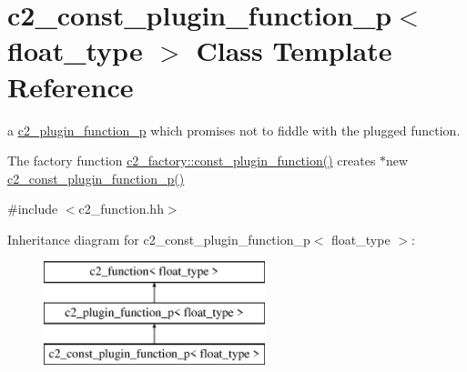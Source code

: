 \hypertarget{classc2__const__plugin__function__p}{\section{c2\-\_\-const\-\_\-plugin\-\_\-function\-\_\-p$<$ float\-\_\-type $>$ Class Template Reference}
\label{classc2__const__plugin__function__p}
}


a \hyperlink{classc2__plugin__function__p}{c2\-\_\-plugin\-\_\-function\-\_\-p} which promises not to fiddle with the plugged function.

The factory function \hyperlink{classc2__factory_aebeb20651a347e1fa8f14118faf2588e}{c2\-\_\-factory\-::const\-\_\-plugin\-\_\-function()} creates $\ast$new \hyperlink{classc2__const__plugin__function__p_a443dc7bcbdc6e458673b98aedf53ad56}{c2\-\_\-const\-\_\-plugin\-\_\-function\-\_\-p()}  




{\ttfamily \#include $<$c2\-\_\-function.\-hh$>$}

Inheritance diagram for c2\-\_\-const\-\_\-plugin\-\_\-function\-\_\-p$<$ float\-\_\-type $>$\-:\begin{figure}[H]
\begin{center}
\leavevmode
\includegraphics[height=3.000000cm]{classc2__const__plugin__function__p}
\end{center}
\end{figure}
